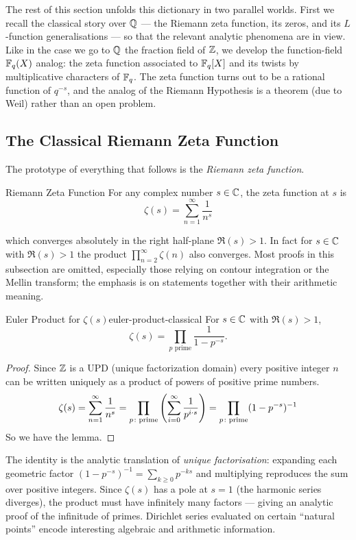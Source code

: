 The rest of this section unfolds this dictionary in two parallel worlds. First we recall the classical story over $\mathbb{Q}$ --- the Riemann zeta function, its zeros, and its $L$-function generalisations --- so that the relevant analytic phenomena are in view. Like in the case we go to $\mathbb{Q}$ the fraction field of $\mathbb{Z}$, we  develop the function-field $\mathbb{F}_q(X)$ analog: the zeta function associated to $\mathbb{F}_q[X]$ and its twists by multiplicative characters of $\mathbb{F}_q$. The zeta function turns out to be a rational function of $q^{-s}$, and the analog of the Riemann Hypothesis is a theorem (due to Weil) rather than an open problem.

\subsection{The Classical Riemann Zeta Function}
The prototype of everything that follows is the \emph{Riemann zeta function}.
\begin{Definition}{Riemann Zeta Function}{}
  For any complex number $s\in\mathbb{C}$, the zeta function at $s$ is $$\zeta(s)=\sum_{n=1}^{\infty}\frac{1}{n^s}$$
\end{Definition}

which converges absolutely in the right half-plane $\Re(s)>1$. In fact for $s\in\mathbb{C}$ with $\Re(s)>1$ the product $\prod_{n=2}^{\infty}\zeta(n)$ also converges. Most proofs in this subsection are omitted, especially those relying on contour integration or the Mellin transform; the emphasis is on statements together with their arithmetic meaning.

\begin{Theorem}{Euler Product for $\zeta(s)$}{euler-product-classical}%
  For $s\in\mathbb{C}$ with $\Re(s)>1$,
  $$\zeta(s)=\prod_{p\text{ prime}}\frac{1}{1-p^{-s}}.$$
\end{Theorem}
\begin{proof}
  Since $\mathbb{Z}$ is a UPD (unique factorization domain) every positive integer $n$ can be written uniquely as a product of powers of positive prime numbers. $$    \zeta(s) = \sum_{n=1}^{\infty}\frac{1}{n^s}= \prod_{p\colon\text{prime}}\left(\sum_{i=0}^{\infty}\frac{1}{p^{i\cdot s}}\right) = \prod_{p\colon\text{prime}} (1-p^{-s})^{-1}$$
  So we have the lemma.
\end{proof}
The identity is the analytic translation of \emph{unique factorisation}: expanding each geometric factor $(1-p^{-s})^{-1}=\sum_{k\geq 0}p^{-ks}$ and multiplying reproduces the sum over positive integers. Since $\zeta(s)$ has a pole at $s=1$ (the harmonic series diverges), the product must have infinitely many factors --- giving an analytic proof of the infinitude of primes. Dirichlet series evaluated on certain ``natural points'' encode interesting algebraic and arithmetic information.

